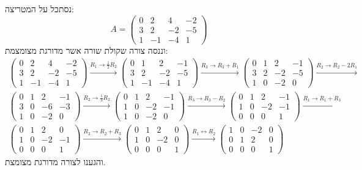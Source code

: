 \documentclass{tstextbook}
\begin{document}
\begin{example}
נסתכל על המטריצה:
$$A=\begin{pmatrix} 0 & 2 & 4 & -2 \\3 & 2 & -2 & -5 \\1 & -1 & -4 & 1\end{pmatrix}$$
וננסה צורה שקולת שורה אשר מדורגת מצומצמת:
\begin{gather*}\begin{pmatrix}0 & 2 & 4 & -2 \\3 & 2 & -2 & -5 \\1 & -1 & -4 & 1\end{pmatrix}\xrightarrow{R_{1}\to \frac{1}{2}R_{2}}\begin{pmatrix}0 & 1 & 2 & -1 \\3 & 2 & -2 & -5 \\1 & -1 & -4 & 1\end{pmatrix}\xrightarrow{R_{3}\to  R_{3}+R_{1}}\begin{pmatrix}0 & 1 & 2 & -1 \\3 & 2 & -2 & -5 \\1 & 0 & -2 & 0\end{pmatrix}\xrightarrow{R_{2}\to R_{2}-2R_{1}} \\\begin{pmatrix}0 & 1 & 2 & -1 \\3 & 0 & -6 & -3 \\1 & 0 & -2 & 0\end{pmatrix}\xrightarrow{R_{2}\to \frac{1}{3}R_{2}}\begin{pmatrix}0 & 1 & 2 & -1 \\1 & 0 & -2 & -1 \\1 & 0 & -2 & 0\end{pmatrix}\xrightarrow{R_{3}\to R_{3}-R_{2}}\begin{pmatrix}0 & 1 & 2 & -1 \\1 & 0 & -2 & -1 \\0 & 0 & 0 & 1\end{pmatrix}\xrightarrow{R_{1}\to R_{1}+R_{3}} \\\begin{pmatrix}0 & 1 & 2 & 0 \\1 & 0 & -2 & -1 \\0 & 0 & 0 & 1\end{pmatrix}\xrightarrow{R_{2}\to R_{2}+R_{3}}\begin{pmatrix}0 & 1 & 2 & 0 \\1 & 0 & -2 & 0 \\0 & 0 & 0 & 1\end{pmatrix}\xrightarrow{R_{1}\leftrightarrow  R_{2}}\begin{pmatrix}1 & 0 & -2 & 0 \\0 & 1 & 2 & 0 \\0 & 0 & 0 & 1\end{pmatrix}
\end{gather*}
והגענו לצורה מדורגת מצומצת. 

\end{example}
\end{document}
